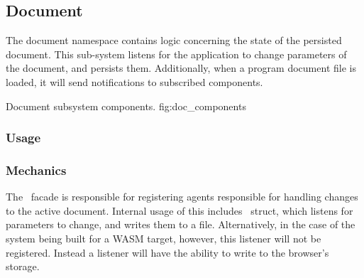 \newcommand{\docarea}[3]{
    \index{#1}\pbodyitem{#2}{#3}
}

\newcommand{\extparamref}[3]{
    \index{#1}\pbodyitem{#2}{#3}
}

\subsection{Document}
The document namespace contains logic concerning the state of the persisted document.
This sub-system listens for the application to change parameters of the document, and persists them.
Additionally, when a program document file is loaded, it will send notifications to subscribed components.

{Document subsystem components.}
{fig:doc_components}

\subsubsection{Usage}


\subsubsection{Mechanics}
The \dmod\ facade is responsible for registering agents responsible for handling changes to the active document.
Internal usage of this includes \dffspcstype\ struct, which listens for parameters to change, and writes them to a file.
Alternatively, in the case of the system being built for a WASM target, however, this listener will not be registered.
Instead a \dflspcstype{} listener will have the ability to write to the browser's storage.